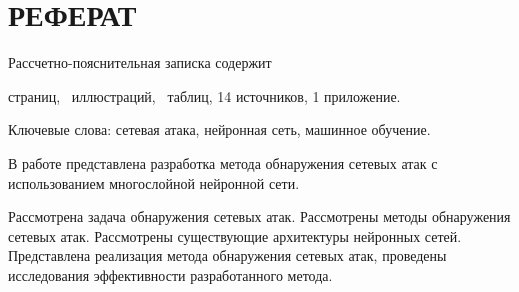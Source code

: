 \chapter*{РЕФЕРАТ}

Рассчетно-пояснительная записка содержит \begin{NoHyper}\pageref{LastPage}\end{NoHyper} страниц, \totfig~иллюстраций, \tottab~таблиц, 14 источников, 1 приложение.

Ключевые слова: сетевая атака, нейронная сеть, машинное обучение.

В работе представлена разработка метода обнаружения сетевых атак с использованием многослойной нейронной сети.

Рассмотрена задача обнаружения сетевых атак. Рассмотрены методы обнаружения сетевых атак. Рассмотрены существующие архитектуры нейронных сетей. Представлена реализация метода обнаружения сетевых атак, проведены исследования эффективности разработанного метода.  



